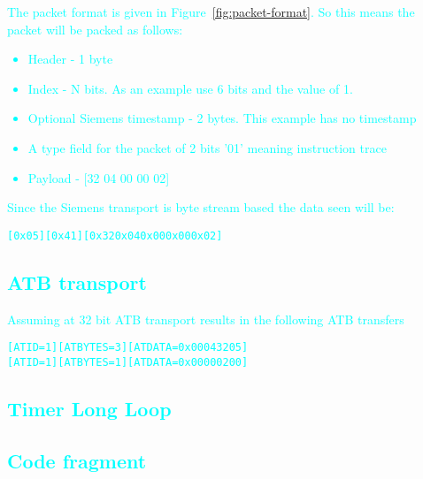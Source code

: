 \textcolor{cyan}{The packet format is given in Figure~\ref{fig:packet-format}. So this means the packet will be packed as follows:}

\textcolor{cyan}{\begin{itemize}
\item
  Header - 1 byte
\item
  Index - N bits. As an example use 6 bits and the value of 1. 
\item
  Optional Siemens timestamp - 2 bytes. This example has no timestamp
\item
A type field for the packet of 2 bits '01' meaning instruction trace  
\item
  Payload - [32 04 00 00 02]
\end{itemize}}

\textcolor{cyan}{Since the Siemens transport is byte stream based the data seen will be:}

\begin {alltt}
\textcolor{cyan}{[0x05][0x41][0x32 0x04 0x00 0x00 0x02]}
\end{alltt}


\textcolor{cyan}{\subsection{ATB transport}}

\textcolor{cyan}{Assuming at 32 bit ATB transport results in the following ATB transfers}

\begin {alltt}
\textcolor{cyan}{[ATID=1] [ATBYTES = 3] [ATDATA = 0x00043205]
[ATID=1] [ATBYTES = 1] [ATDATA = 0x00000200]}
\end{alltt}


\textcolor{cyan}{\section{Timer Long Loop}}

\textcolor{cyan}{\subsection{Code fragment}}

